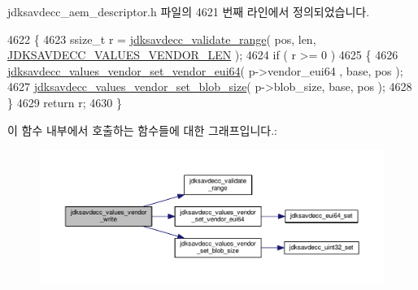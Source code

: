 jdksavdecc\+\_\+aem\+\_\+descriptor.\+h 파일의 4621 번째 라인에서 정의되었습니다.


\begin{DoxyCode}
4622 \{
4623     ssize\_t r = \hyperlink{group__util_ga9c02bdfe76c69163647c3196db7a73a1}{jdksavdecc\_validate\_range}( pos, len, 
      \hyperlink{group__values__vendor_ga9c664c291aa8ec431f7399f836701ca5}{JDKSAVDECC\_VALUES\_VENDOR\_LEN} );
4624     \textcolor{keywordflow}{if} ( r >= 0 )
4625     \{
4626         \hyperlink{group__values__vendor_gaa33a0dbeb2897ccd7159dff3714fad7b}{jdksavdecc\_values\_vendor\_set\_vendor\_eui64}( p->vendor\_eui64
      , base, pos );
4627         \hyperlink{group__values__vendor_ga7447e93f8538b9181832c2f8a89ed1e5}{jdksavdecc\_values\_vendor\_set\_blob\_size}( p->blob\_size, base, 
      pos );
4628     \}
4629     \textcolor{keywordflow}{return} r;
4630 \}
\end{DoxyCode}


이 함수 내부에서 호출하는 함수들에 대한 그래프입니다.\+:
\nopagebreak
\begin{figure}[H]
\begin{center}
\leavevmode
\includegraphics[width=350pt]{group__values__vendor_ga74487688c015483d3b92772d0b59444c_cgraph}
\end{center}
\end{figure}


